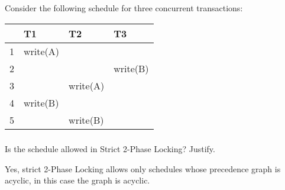\subsection{}

{	\color{gray}
Consider the following schedule for three concurrent transactions:
}
{
	\color{gray}
	\begin{table}[H]
\centering
{\color{gray}
	\begin{tabular}{l|l|l|l|}
	\cline{2-4}
		                    & T1       & T2       & T3       \\ \hline
	\multicolumn{1}{|l|}{1} & write(A) &          &          \\ \hline
	\multicolumn{1}{|l|}{2} &          &          & write(B) \\ \hline
	\multicolumn{1}{|l|}{3} &          & write(A) &          \\ \hline
	\multicolumn{1}{|l|}{4} & write(B) &          &          \\ \hline
	\multicolumn{1}{|l|}{5} &          & write(B) &          \\ \hline
	\end{tabular}
}
	\end{table}

}

\subsubsection{}
{\color{gray}Is the schedule allowed in Strict 2-Phase Locking? Justify.}
\begin{center}
\end{center}
	
	Yes, strict 2-Phase Locking allows only schedules whose precedence graph is acyclic, in this case the graph is acyclic.

\subsubsection{}

